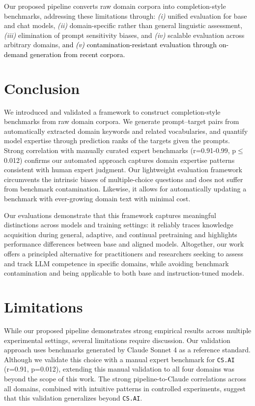 \documentclass[10pt]{article}
\newcommand{\revision}[1]{\textcolor{black}{#1}}
\begin{document}
Our proposed pipeline converts raw domain corpora into completion-style benchmarks, addressing these limitations through: \textit{(i)} unified evaluation for base and chat models, \textit{(ii)} domain-specific rather than general linguistic assessment, \textit{(iii)} elimination of prompt sensitivity biases, and \textit{(iv)} scalable evaluation across arbitrary domains, \revision{and \textit{(v)} contamination-resistant evaluation through on-demand generation from recent corpora.}


\section{Conclusion} \vspace*{-.25cm}
We introduced and validated a framework to construct completion-style benchmarks from raw domain corpora. We generate prompt–target pairs from automatically extracted domain keywords and related vocabularies, and quantify model expertise through prediction ranks of the targets given the prompts. Strong correlation with manually curated expert benchmarks (r=0.91-0.99, p$\leq$0.012) confirms our automated approach captures domain expertise patterns consistent with human expert judgment.
Our lightweight evaluation framework circumvents the intrinsic biases of multiple-choice questions and does not suffer from benchmark contamination.
Likewise, it allows for automatically updating a benchmark with ever-growing domain text with minimal cost.

Our evaluations demonstrate that this framework captures meaningful distinctions across models and training settings: it reliably traces knowledge acquisition during general, adaptive, and continual pretraining and highlights performance differences between base and aligned models.
Altogether, our work offers a principled alternative for practitioners and researchers seeking to assess and track LLM competence in specific domains, while avoiding benchmark contamination and being applicable to both base and instruction-tuned models. 




\section{Limitations} \vspace*{-.25cm}
While our proposed pipeline demonstrates strong empirical results across multiple experimental settings, several limitations require discussion. Our validation approach uses benchmarks generated by Claude Sonnet 4 as a reference standard. Although we validate this choice with a manual expert benchmark for \texttt{CS.AI} (r=0.91, p=0.012), extending this manual validation to all four domains was beyond the scope of this work. The strong pipeline-to-Claude correlations across all domains, combined with intuitive patterns in controlled experiments, suggest that this validation generalizes beyond \texttt{CS.AI}.
\end{document}
